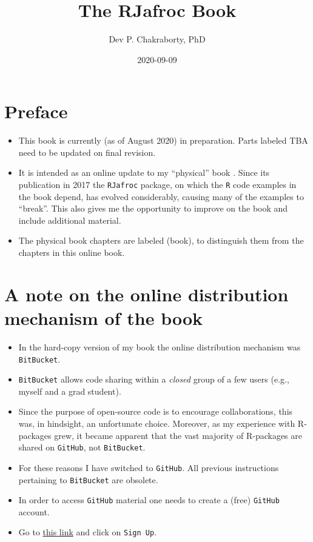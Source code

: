 \documentclass[
]{book}
\title{The RJafroc Book}
\author{Dev P. Chakraborty, PhD}
\date{2020-09-09}
\providecommand{\tightlist}{%
  \setlength{\itemsep}{0pt}\setlength{\parskip}{0pt}}
\begin{document}
\maketitle

{
\setcounter{tocdepth}{1}
\tableofcontents
}
\hypertarget{preface}{%
\chapter*{Preface}\label{preface}}

\begin{itemize}
\tightlist
\item
  This book is currently (as of August 2020) in preparation. Parts labeled TBA need to be updated on final revision.
\item
  It is intended as an online update to my ``physical'' book \citep{RN2680}. Since its publication in 2017 the \texttt{RJafroc} package, on which the \texttt{R} code examples in the book depend, has evolved considerably, causing many of the examples to ``break''. This also gives me the opportunity to improve on the book and include additional material.
\item
  The physical book chapters are labeled (book), to distinguish them from the chapters in this online book.
\end{itemize}

\hypertarget{a-note-on-the-online-distribution-mechanism-of-the-book}{%
\chapter*{A note on the online distribution mechanism of the book}\label{a-note-on-the-online-distribution-mechanism-of-the-book}}

\begin{itemize}
\tightlist
\item
  In the hard-copy version of my book \citep{RN2680} the online distribution mechanism was \texttt{BitBucket}.
\item
  \texttt{BitBucket} allows code sharing within a \emph{closed} group of a few users (e.g., myself and a grad student).
\item
  Since the purpose of open-source code is to encourage collaborations, this was, in hindsight, an unfortunate choice. Moreover, as my experience with R-packages grew, it became apparent that the vast majority of R-packages are shared on \texttt{GitHub}, not \texttt{BitBucket}.
\item
  For these reasons I have switched to \texttt{GitHub}. All previous instructions pertaining to \texttt{BitBucket} are obsolete.
\item
  In order to access \texttt{GitHub} material one needs to create a (free) \texttt{GitHub} account.
\item
  Go to \href{https://github.com}{this link} and click on \texttt{Sign\ Up}.
\end{itemize}
\end{document}
